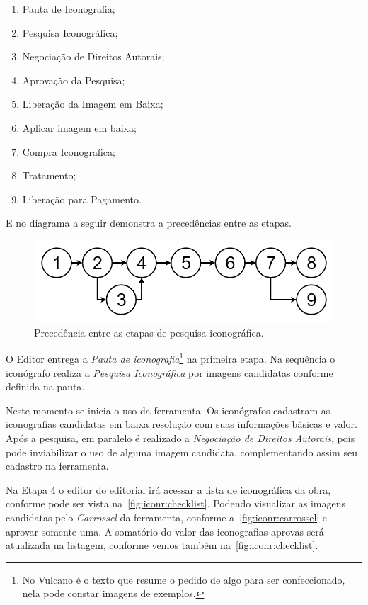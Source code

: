 \documentclass[
  12pt,            %
  openany,
  oneside,
  a4paper,         %
  english,      %
  brazil
]{article}
\numberwithin{figure}{section}
\numberwithin{table}{section}
\begin{document}
\vspace{-10mm}
\begin{singlespace}
  \begin{enumerate}
    \item Pauta de Iconografia;
    \item Pesquisa Iconográfica;
    \item Negociação de Direitos Autorais;
    \item Aprovação da Pesquisa;
    \item Liberação da Imagem em Baixa;
    \item Aplicar imagem em baixa;
    \item Compra Iconografica;
    \item Tratamento;
    \item Liberação para Pagamento.
  \end{enumerate}
\end{singlespace}
\vspace{-5mm}

E no diagrama a seguir demonstra a precedências entre as etapas.

\begin{figure}[H]
  \centering
  \includegraphics[width=0.7\linewidth]{Iconr_etapas}
  \vspace{-5mm}
  \caption{Precedência entre as etapas de pesquisa iconográfica.}
  \label{fig:iconr:etapas}
\end{figure}

O Editor entrega a \textit{Pauta de iconografia}\footnote{No Vulcano é o texto que resume o pedido de algo para ser confeccionado, nela pode constar imagens de exemplos.} na primeira etapa. Na sequência o iconógrafo realiza a \textit{Pesquisa Iconográfica} por imagens candidatas conforme definida na pauta.

Neste momento se inicia o uso da ferramenta. Os iconógrafos cadastram as iconografias candidatas em baixa resolução com suas informações básicas e valor. Após a pesquisa, em paralelo é realizado a \textit{Negociação de Direitos Autorais}, pois pode inviabilizar o uso de alguma imagem candidata, complementando assim seu cadastro na ferramenta.

Na Etapa 4 o editor do editorial irá acessar a lista de iconográfica da obra, conforme pode ser vista na~\autoref{fig:iconr:checklist}. Podendo visualizar as imagens candidatas pelo \textit{Carrossel} da ferramenta, conforme a~\autoref{fig:iconr:carrossel} e aprovar somente uma. A somatório do valor das iconografias aprovas será atualizada na listagem, conforme vemos também na~\autoref{fig:iconr:checklist}.
\end{document}
